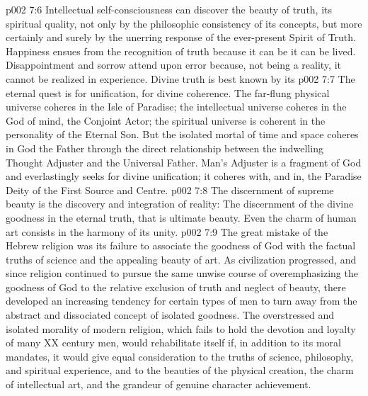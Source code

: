\vs p002 7:6 Intellectual self\hyp{}consciousness can discover the beauty of truth, its spiritual quality, not only by the philosophic consistency of its concepts, but more certainly and surely by the unerring response of the ever\hyp{}present Spirit of Truth. Happiness ensues from the recognition of truth because it can be  it can be lived. Disappointment and sorrow attend upon error because, not being a reality, it cannot be realized in experience. Divine truth is best known by its 
\vs p002 7:7 \pc The eternal quest is for unification, for divine coherence. The far\hyp{}flung physical universe coheres in the Isle of Paradise; the intellectual universe coheres in the God of mind, the Conjoint Actor; the spiritual universe is coherent in the personality of the Eternal Son. But the isolated mortal of time and space coheres in God the Father through the direct relationship between the indwelling Thought Adjuster and the Universal Father. Man’s Adjuster is a fragment of God and everlastingly seeks for divine unification; it coheres with, and in, the Paradise Deity of the First Source and Centre.
\vs p002 7:8 \pc The discernment of supreme beauty is the discovery and integration of reality: The discernment of the divine goodness in the eternal truth, that is ultimate beauty. Even the charm of human art consists in the harmony of its unity.
\vs p002 7:9 The great mistake of the Hebrew religion was its failure to associate the goodness of God with the factual truths of science and the appealing beauty of art. As civilization progressed, and since religion continued to pursue the same unwise course of overemphasizing the goodness of God to the relative exclusion of truth and neglect of beauty, there developed an increasing tendency for certain types of men to turn away from the abstract and dissociated concept of isolated goodness. The overstressed and isolated morality of modern religion, which fails to hold the devotion and loyalty of many XX century men, would rehabilitate itself if, in addition to its moral mandates, it would give equal consideration to the truths of science, philosophy, and spiritual experience, and to the beauties of the physical creation, the charm of intellectual art, and the grandeur of genuine character achievement.
